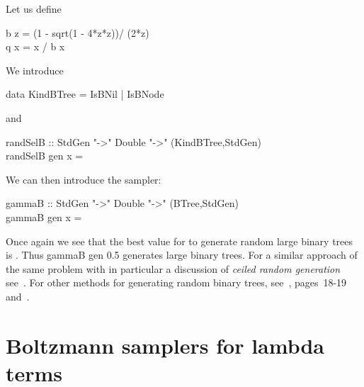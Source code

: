 \documentclass{sig-alternate}
\begin{document}
\begin{figure*}[!t]
Let us define
\begin{haskell}
  b z = (1 - sqrt(1 - 4*z*z))/ (2*z)\\
 q x = x / b x
\end{haskell}
We introduce
\begin{haskell}
  data KindBTree = IsBNil | IsBNode
\end{haskell}
and
\begin{haskell}
\hspace*{-20pt}randSelB  :: StdGen "->"  Double "->" (KindBTree,StdGen)\\
\hspace*{-20pt}randSelB gen x = 
\end{haskell}
We can then introduce the sampler:
\begin{haskell}
\hspace*{-25pt} gammaB :: StdGen "->" Double "->" (BTree,StdGen)\\
\hspace*{-25pt} gammaB gen x = 
\qquad {}
\end{haskell}

Once again we see that the best value for  to generate random large binary trees
is  . Thus \<gammaB gen 0.5\> generates large
binary trees.  For a similar approach of the same problem with in particular a
discussion of \emph{ceiled random generation} see~\cite{yorgey13:_blog}.  For other
methods for generating random binary trees, see~\cite{KnuthVol4_4}, pages~18-19
and~\cite{DBLP:journals/ita/Remy85}.

\section{Boltzmann samplers for lambda terms}
\label{sec:lambda}


\end{figure*}
\end{document}
